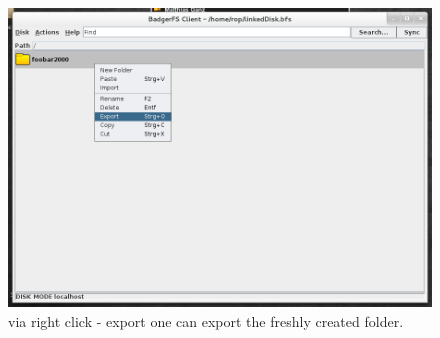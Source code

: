 \begin{figure}[h!]
\centering
\includegraphics[width=1\textwidth]{figures/serverUseCase/13_export.png}
\caption{ via right click - export one can export the freshly created folder.}
\label{fig:13_export.png}
\end{figure}
